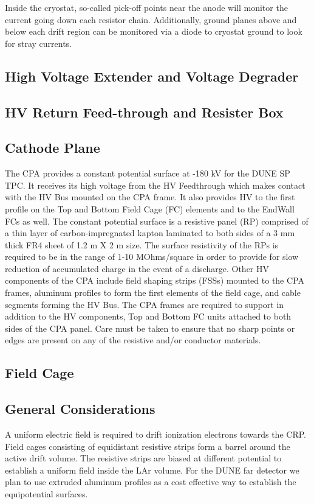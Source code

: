 Inside the cryostat, so-called pick-off points near the anode will monitor the current going down each resistor chain.  Additionally, ground planes above and below each drift region can be monitored via a diode to cryostat ground to look for stray currents.

\subsection{High Voltage Extender and Voltage Degrader}

\subsection{HV Return Feed-through and Resister Box}

\subsection{Cathode Plane}
The CPA provides a constant potential surface at -180 kV for the DUNE SP TPC.  It receives its high voltage from the HV Feedthrough which makes contact with the HV Bus mounted on the CPA frame.  It also provides HV to the first profile on the Top and Bottom Field Cage (FC) elements and to the EndWall FCs as well.  The constant potential surface is a resistive panel (RP) comprised of a thin layer of carbon-impregnated kapton laminated to both sides of a 3 mm thick FR4 sheet of 1.2 m X 2 m size.  The surface resistivity of the RPs is required to be in the range of 1-10 MOhms/square in order to provide for slow reduction of accumulated charge in the event of a discharge.  Other HV components of the CPA include field shaping strips (FSSs) mounted to the CPA frames, aluminum profiles to form the first elements of the field cage, and cable segments forming the HV Bus.  The CPA frames are required to support in addition to the HV components, Top and Bottom FC units attached to both sides of the CPA panel.  Care must be taken to ensure that no sharp points or edges are present on any of the resistive and/or conductor materials.  
\subsection{Field Cage}

\subsection{General Considerations}

A uniform electric field is required to drift ionization electrons towards the CRP. Field cages consisting of equidistant resistive strips form a barrel around the active drift volume. The resistive strips are biased at different potential to establish a uniform field inside the LAr volume.
For the DUNE far detector we plan to use extruded aluminum profiles as a cost effective way to establish the equipotential surfaces. 

